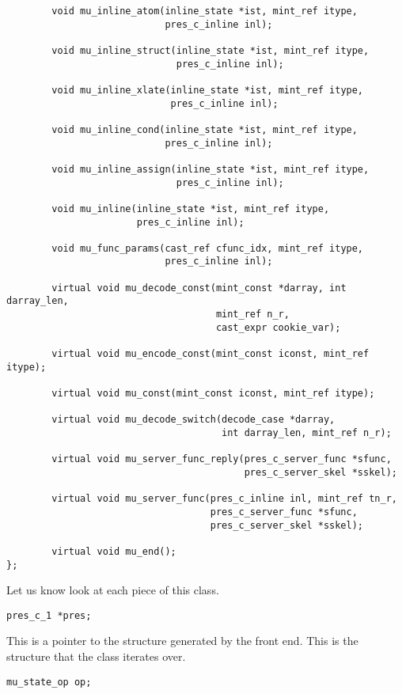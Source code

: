 \begin{verbatim}
        void mu_inline_atom(inline_state *ist, mint_ref itype,
                            pres_c_inline inl);

        void mu_inline_struct(inline_state *ist, mint_ref itype,
                              pres_c_inline inl);

        void mu_inline_xlate(inline_state *ist, mint_ref itype,
                             pres_c_inline inl);

        void mu_inline_cond(inline_state *ist, mint_ref itype,
                            pres_c_inline inl);

        void mu_inline_assign(inline_state *ist, mint_ref itype,
                              pres_c_inline inl);

        void mu_inline(inline_state *ist, mint_ref itype,
                       pres_c_inline inl);

        void mu_func_params(cast_ref cfunc_idx, mint_ref itype,
                            pres_c_inline inl);

        virtual void mu_decode_const(mint_const *darray, int darray_len,
                                     mint_ref n_r,
                                     cast_expr cookie_var);

        virtual void mu_encode_const(mint_const iconst, mint_ref itype);

        virtual void mu_const(mint_const iconst, mint_ref itype);

        virtual void mu_decode_switch(decode_case *darray,
                                      int darray_len, mint_ref n_r);

        virtual void mu_server_func_reply(pres_c_server_func *sfunc,
                                          pres_c_server_skel *sskel);

        virtual void mu_server_func(pres_c_inline inl, mint_ref tn_r,
                                    pres_c_server_func *sfunc,
                                    pres_c_server_skel *sskel);

        virtual void mu_end();
};
\end{verbatim}

Let us know look at each piece of this class.

\noindent\verb|pres_c_1 *pres;|

This is a pointer to the \cpres{} structure generated by the front end.  This
is the structure that the \mus{} class iterates over.

\noindent\verb|mu_state_op op;|

